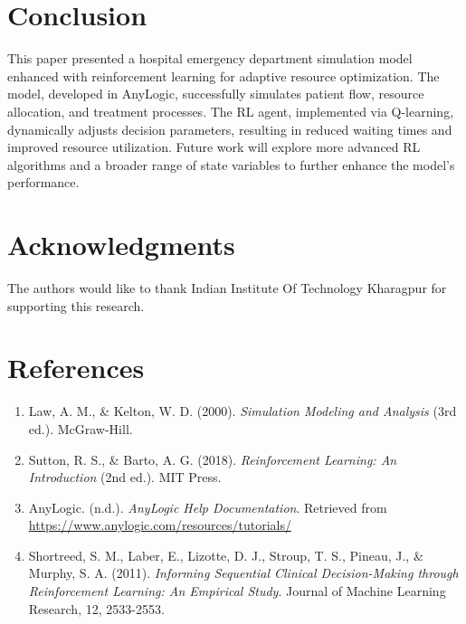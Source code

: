 \documentclass[12pt]{article}
\begin{document}
\section{Conclusion}
This paper presented a hospital emergency department simulation model enhanced with reinforcement learning for adaptive resource optimization. The model, developed in AnyLogic, successfully simulates patient flow, resource allocation, and treatment processes. The RL agent, implemented via Q-learning, dynamically adjusts decision parameters, resulting in reduced waiting times and improved resource utilization. Future work will explore more advanced RL algorithms and a broader range of state variables to further enhance the model's performance.

\section*{Acknowledgments}
The authors would like to thank Indian Institute Of Technology Kharagpur for supporting this research.

\section*{References}
\begin{enumerate}[noitemsep]
    \item Law, A. M., \& Kelton, W. D. (2000). \textit{Simulation Modeling and Analysis} (3rd ed.). McGraw-Hill.
    \item Sutton, R. S., \& Barto, A. G. (2018). \textit{Reinforcement Learning: An Introduction} (2nd ed.). MIT Press.
    \item AnyLogic. (n.d.). \textit{AnyLogic Help Documentation}. Retrieved from \url{https://www.anylogic.com/resources/tutorials/}
    \item Shortreed, S. M., Laber, E., Lizotte, D. J., Stroup, T. S., Pineau, J., \& Murphy, S. A. (2011). \textit{Informing Sequential Clinical Decision-Making through Reinforcement Learning: An Empirical Study}. Journal of Machine Learning Research, 12, 2533-2553.
\end{enumerate}
\end{document}
